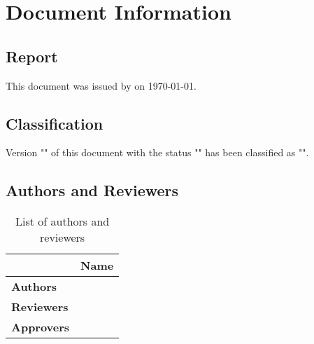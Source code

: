 %
%
%
\clearpage
\pagebreak

\chapter*{Document Information} 
\label{chapter:DocumentInformation}
\vspace{1cm}

\section*{Report}
\label{section:Report}
\renewcommand{\ReportDate}{\usdate\today}

\noindent This document was issued by \DisclaimerOnBehalfOfLongName on \ReportDate.

\section*{Classification}
\label{section:Classification}

Version "\ReportVersion" of this document with the status "\ReportStatus" has been classified as "\ReportDocumentClassification".

\medskip
\par
\noindent

\section*{Authors and Reviewers}
\label{section:AuthorsReviewers}

\begin{table}[h]
\begin{tabularx}{\textwidth}{|l|X|}
	\hline
	\rowcolor{grey230} & \bf{Name} \\[3pt]
	\hline
	\bf{Authors} & \ReportDocumentAuthor \\
	\hline
	\bf{Reviewers} & \ReportDocumentReviewer \\
	\hline
	\bf{Approvers} & \ReportDocumentApprover \\
	\hline
\end{tabularx}
\label{table:ListAuthorsReviewers}
\caption{List of authors and reviewers}
\end{table}

\medskip
\par
\noindent

